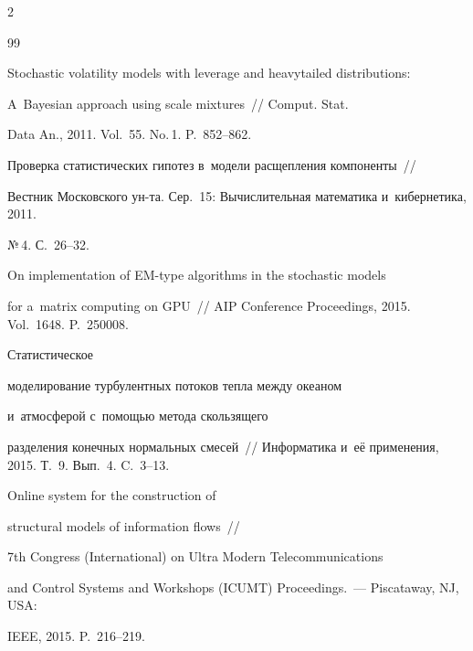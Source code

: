 \begin{multicols}{2}
{{\begin{thebibliography}{99}

Stochastic volatility models with leverage and heavytailed distributions: 

A~Bayesian approach using scale mixtures~// Comput. Stat. 

Data An., 2011. Vol.~55. No.\,1. P.~852--862.





Проверка статистических гипотез в~модели расщепления компоненты~//

Вестник Московского ун-та. Сер.~15: Вычислительная математика и~кибернетика, 2011. 

№\,4. С.~26--32.





On implementation of EM-type algorithms in the stochastic models 

for a~matrix computing on GPU~// AIP Conference Proceedings, 2015. Vol.~1648. P.~250008.






 Статистическое

моделирование турбулентных потоков тепла между океаном 

и~атмосферой с~помощью метода скользящего

разделения конечных нормальных смесей~// Информатика и~её применения, 2015. Т.~9. Вып.~4. C.~3--13.




 Online system for the construction of

structural models of information flows~// 

7th  Congress (International) on Ultra Modern Telecommunications

and Control Systems and Workshops (ICUMT) Proceedings.~--- Piscataway, NJ, USA:

IEEE, 2015. P.~216--219.



\end{thebibliography}



 }

 }



\end{multicols}



